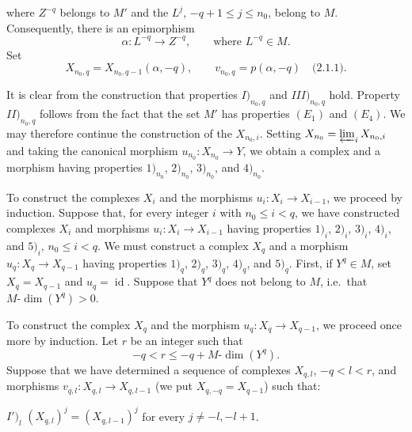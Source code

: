 \clearpage
{}%
\begingroup\small\setlength{\parskip}{0pt}\setlength{\emergencystretch}{1.5em}
\setlength{\abovedisplayskip}{4pt plus 2pt minus 2pt}%
\setlength{\belowdisplayskip}{4pt plus 2pt minus 2pt}%

where $Z^{-q}$ belongs to $M'$ and the $L^j$, $-q+1\leq j\leq n_0$,
belong to $M$. Consequently, there is an epimorphism
\[
\alpha\colon L^{-q}\longrightarrow Z^{-q},
\qquad\text{where }L^{-q}\in M.
\]
Set
\[
X_{n_0,q}=X_{n_0,q-1}(\alpha,-q),
\qquad
v_{n_0,q}=p(\alpha,-q)\quad\text{(2.1.1)}.
\]

It is clear from the construction that properties
$I)_{n_0,q}$ and $III)_{n_0,q}$ hold. Property
$II)_{n_0,q}$ follows from the fact that the set $M'$ has
properties $(E_1)$ and $(E_4)$. We may therefore continue the construction
of the $X_{n_0,i}$. Setting $X_{n_0}=\varprojlim_i X_{n_0,i}$ and taking
the canonical morphism $u_{n_0}\colon X_{n_0}\longrightarrow Y$, we
obtain a complex and a morphism having properties $1)_{n_0}$,
$2)_{n_0}$, $3)_{n_0}$, and $4)_{n_0}$.

To construct the complexes $X_i$ and the morphisms
$u_i\colon X_i\longrightarrow X_{i-1}$, we proceed by induction. Suppose
that, for every integer $i$ with $n_0\leq i<q$, we have constructed
complexes $X_i$ and morphisms $u_i\colon X_i\longrightarrow X_{i-1}$
having properties $1)_i$, $2)_i$, $3)_i$, $4)_i$, and $5)_i$,
$n_0\leq i<q$. We must construct a complex $X_q$ and a morphism
$u_q\colon X_q\longrightarrow X_{q-1}$ having properties $1)_q$,
$2)_q$, $3)_q$, $4)_q$, and $5)_q$. First, if $Y^q\in M$, set
$X_q=X_{q-1}$ and $u_q=\operatorname{id}$. Suppose that $Y^q$ does not
belong to $M$, i.e.\ that $M\text{-}\dim(Y^q)>0$.

To construct the complex $X_q$ and the morphism
$u_q\colon X_q\longrightarrow X_{q-1}$, we proceed once more by
induction. Let $r$ be an integer such that
\[
-q<r\leq -q+M\text{-}\dim(Y^q).
\]
Suppose that we have determined a sequence of complexes $X_{q,l}$,
$-q<l<r$, and morphisms
$v_{q,l}\colon X_{q,l}\longrightarrow X_{q,l-1}$ (we put
$X_{q,-q}=X_{q-1}$) such that:

\noindent$I')_l$
$(X_{q,l})^j=(X_{q,l-1})^j$ for every $j\neq-l,-l+1$.

